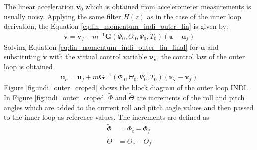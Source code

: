 \documentclass[11pt, a4paper, twoside]{report}
\begin{document}
The linear acceleration $\bm{\dot{v}}_0$ which is obtained from accelerometer measurements is usually noisy. Applying the same filter $H(z)$ as in the case of the inner loop derivation, the Equation \ref{eq:lin_momentum_indi_outer_lin} is given by:
\begin{equation}
	\begin{split}
		\bm{\dot{v}} = \bm{\dot{v}}_f +  m^{-1} \bm{G}(\Phi_0, \Theta_0, \Psi_0, T_0) (\bm{u} - \bm{u}_f)
		\label{eq:lin_momentum_indi_outer_lin_final}
	\end{split}
\end{equation}
Solving Equation \ref{eq:lin_momentum_indi_outer_lin_final} for $\bm{u}$ and substituting $\bm{\dot{v}}$ with the virtual control variable $\bm{\nu}_{\bm{\dot{v}}}$, the control law of the outer loop is obtained
\begin{equation}
	\begin{split}
		\bm{u_c} = \bm{u}_f +  m \bm{G}^{-1}(\Phi_0, \Theta_0, \Psi_0, T_0) (\bm{\nu}_{\bm{\dot{v}}} - \bm{\dot{v}}_f)
		\label{eq:indi_outer_control_law}
	\end{split}
\end{equation}
Figure \ref{fig:indi_outer_croped} shows the block diagram of the outer loop \acrshort{INDI}. In Figure \ref{fig:indi_outer_croped} $\tilde{\Phi}$ and $\tilde{\Theta}$ are increments of the roll and pitch angles which are added to the current roll and pitch angle values and then passed to the inner loop as reference values. The increments are defined as 
\begin{subequations}
	\begin{align}
		\tilde{\Phi} &= \Phi_c - \Phi_f \label{eq:roll_increment} \\
		\tilde{\Theta} &= \Theta_c - \Theta_f \label{eq:pitch_increment}
	\end{align}
	\label{eq:rool_pitch_increments}
\end{subequations}
\end{document}
